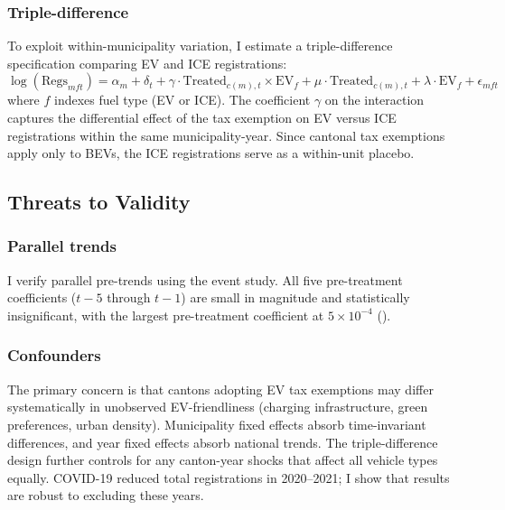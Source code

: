\documentclass[12pt]{article}
\begin{document}
\subsubsection*{Triple-difference} To exploit within-municipality variation, I estimate a triple-difference specification comparing EV and ICE registrations:
\begin{equation}
\log(\text{Regs}_{mft}) = \alpha_m + \delta_t + \gamma \cdot \text{Treated}_{c(m),t} \times \text{EV}_f + \mu \cdot \text{Treated}_{c(m),t} + \lambda \cdot \text{EV}_f + \epsilon_{mft}
\label{eq:triple}
\end{equation}
where $f$ indexes fuel type (EV or ICE). The coefficient $\gamma$ on the interaction captures the differential effect of the tax exemption on EV versus ICE registrations within the same municipality-year. Since cantonal tax exemptions apply only to BEVs, the ICE registrations serve as a within-unit placebo.

\subsection{Threats to Validity}

\subsubsection*{Parallel trends} I verify parallel pre-trends using the \citet{callaway2021difference} event study. All five pre-treatment coefficients ($t-5$ through $t-1$) are small in magnitude and statistically insignificant, with the largest pre-treatment coefficient at $5 \times 10^{-4}$ ().

\subsubsection*{Confounders} The primary concern is that cantons adopting EV tax exemptions may differ systematically in unobserved EV-friendliness (charging infrastructure, green preferences, urban density). Municipality fixed effects absorb time-invariant differences, and year fixed effects absorb national trends. The triple-difference design further controls for any canton-year shocks that affect all vehicle types equally. COVID-19 reduced total registrations in 2020--2021; I show that results are robust to excluding these years.
\end{document}
